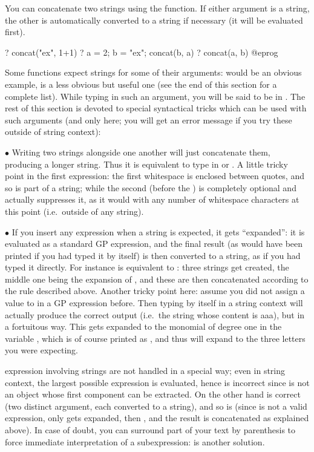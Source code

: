 You can concatenate two strings using the  function. If either
argument is a string, the other is automatically converted to a string if
necessary (it will be evaluated first).

\bprog
? concat("ex", 1+1)
? a = 2; b = "ex"; concat(b, a)
? concat(a, b)
@eprog

Some functions expect strings for some of their arguments:  would
be an obvious example,  is a less obvious but useful one (see the
end of this section for a complete list). While typing in such an argument,
you will be said to be in . The rest of this section is
devoted to special syntactical tricks which can be used with such arguments
(and only here; you will get an error message if you try these outside of
string context):

$\bullet$ Writing two strings alongside one another will just concatenate
them, producing a longer string. Thus it is equivalent to type in
 or . A little tricky point in the first expression:
the first whitespace is enclosed between quotes, and so is part of a string;
while the second (before the ) is completely optional and 
actually suppresses it, as it would with any number of whitespace characters
at this point (i.e.~outside of any string).

$\bullet$ If you insert any expression when a string is expected, it gets
``expanded'': it is evaluated as a standard GP expression, and the final
result (as would have been printed if you had typed it by itself) is then
converted to a string, as if you had typed it directly. For instance  is equivalent to : three strings get created, the middle
one being the expansion of , and these are then concatenated
according to the rule described above. Another tricky point here: assume you
did not assign a value to  in a GP expression before. Then typing
 by itself in a string context will actually produce the correct
output (i.e.~the string whose content is aaa), but in a fortuitous way. This
 gets expanded to the monomial of degree one in the variable
, which is of course printed as , and thus will expand to
the three letters you were expecting.

 expression involving strings are not handled in a
special way; even in string context, the largest possible expression is
evaluated, hence  is incorrect since  is not an
object whose first component can be extracted. On the other hand
 is correct (two distinct argument, each converted to a
string), and so is  (since  is not a valid
expression, only  gets expanded, then , and the result is
concatenated as explained above). In case of doubt, you can surround part of
your text by parenthesis to force immediate interpretation of a
subexpression:  is another solution.

